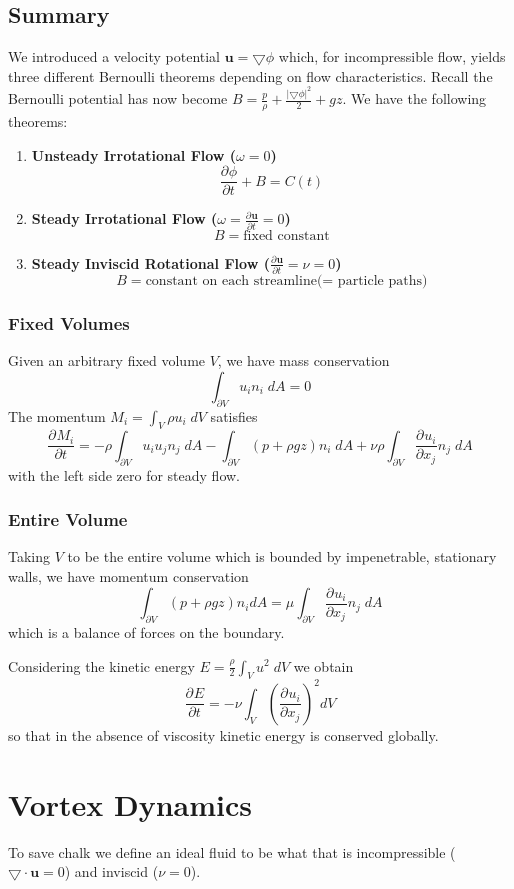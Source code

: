 \documentclass[11pt]{article}
\newcommand*{\pd}[3][]{\ensuremath{\frac{\partial^{#1} {#2}}{\partial {#3}^{#1}}}}
\newcommand{\grad}{\bigtriangledown}
\newcommand{\mv}[1]{\textbf{#1}}
\newcommand{\mdf}[1]{{\color{red}#1}}
\newcommand{\abs}[1]{|#1|}
\begin{document}
\subsection{Summary}
We introduced a velocity potential $\mv{u}=\grad\phi$ which, for incompressible flow, yields three different Bernoulli theorems depending on flow characteristics. Recall the \mdf{Bernoulli potential} has now become $B=\frac{p}{\rho}+\frac{\abs{\grad\phi}^2}{2}+gz$.
We have the following theorems:
\begin{enumerate}
	\item \textbf{Unsteady Irrotational Flow ($\omega=0$)}
		$$\pd{\phi}{t}+B=C(t)$$
	\item \textbf{Steady Irrotational Flow ($\omega=\pd{\mv{u}}{t}=0$)}
		$$B=\text{fixed constant}$$
	\item \textbf{Steady Inviscid Rotational Flow ($\pd{\mv{u}}{t}=\nu=0$)}
		$$B=\text{constant on each streamline(= particle paths)}$$
\end{enumerate}
\subsubsection{Fixed Volumes}
Given an arbitrary fixed volume $V$, we have mass conservation
$$\int_{\partial V}u_in_i\;dA=0$$
The \mdf{momentum} $M_i=\int_V \rho u_i\;dV$ satisfies
$$\pd{M_i}{t}=-\rho\int_{\partial V}u_iu_jn_j\;dA-\int_{\partial V}(p+\rho gz)n_i\;dA+\nu\rho\int_{\partial V}\pd{u_i}{x_j}n_j\;dA$$
with the left side zero for steady flow.
\subsubsection{Entire Volume}
Taking $V$ to be the entire volume which is bounded by impenetrable, stationary walls, we have momentum conservation
$$\int_{\partial V}(p+\rho gz)n_idA = \mu\int_{\partial V}\pd{u_i}{x_j}n_j\;dA$$
which is a balance of forces on the boundary.

Considering the \mdf{kinetic energy} $E=\frac{\rho}{2}\int_V u^2\;dV$ we obtain
$$\pd{E}{t}=-\nu\int_V \left(\pd{u_i}{x_j}\right)^2dV$$
so that in the absence of viscosity kinetic energy is conserved globally.

\section{Vortex Dynamics}
To save chalk we define an \mdf{ideal fluid} to be what that is incompressible ($\grad\cdot\mv{u}=0$) and inviscid ($\nu=0$).
\end{document}

